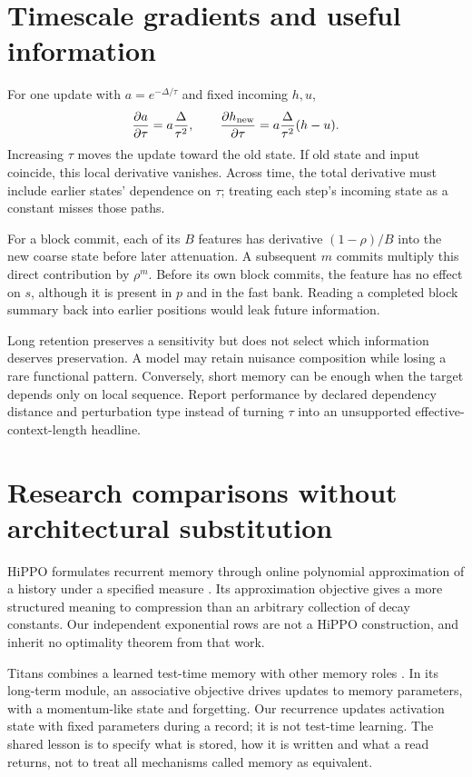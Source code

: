 \section{Timescale gradients and useful information}

For one update with $a=e^{-\Delta/\tau}$ and fixed incoming $h,u$,
\begin{equation}
 \frac{\partial a}{\partial\tau}
 =a\frac{\Delta}{\tau^2},\qquad
 \frac{\partial h_{\rm new}}{\partial\tau}
 =a\frac{\Delta}{\tau^2}(h-u).
 \label{eq:taugrad}
\end{equation}
Increasing $\tau$ moves the update toward the old state. If old state and
input coincide, this local derivative vanishes. Across time, the total
derivative must include earlier states' dependence on $\tau$; treating
each step's incoming state as a constant misses those paths.

For a block commit, each of its $B$ features has derivative
$(1-\rho)/B$ into the new coarse state before later attenuation.
A subsequent $m$ commits multiply this direct contribution by $\rho^m$.
Before its own block commits, the feature has no effect on $s$, although
it is present in $p$ and in the fast bank. Reading a completed block summary
back into earlier positions would leak future information.

Long retention preserves a sensitivity but does not select which information
deserves preservation. A model may retain nuisance composition while losing
a rare functional pattern. Conversely, short memory can be enough when
the target depends only on local sequence. Report performance by declared
dependency distance and perturbation type instead of turning $\tau$ into
an unsupported effective-context-length headline.

\section{Research comparisons without architectural substitution}

HiPPO formulates recurrent memory through online polynomial approximation
of a history under a specified measure \cite{hippo}. Its approximation
objective gives a more structured meaning to compression than an arbitrary
collection of decay constants. Our independent exponential rows are not
a HiPPO construction, and inherit no optimality theorem from that work.

Titans combines a learned test-time memory with other memory roles
\cite{titans}. In its long-term module, an associative objective drives
updates to memory parameters, with a momentum-like state and forgetting.
Our recurrence updates activation state with fixed parameters during a
record; it is not test-time learning. The shared lesson is to specify
what is stored, how it is written and what a read returns, not to treat
all mechanisms called memory as equivalent.

